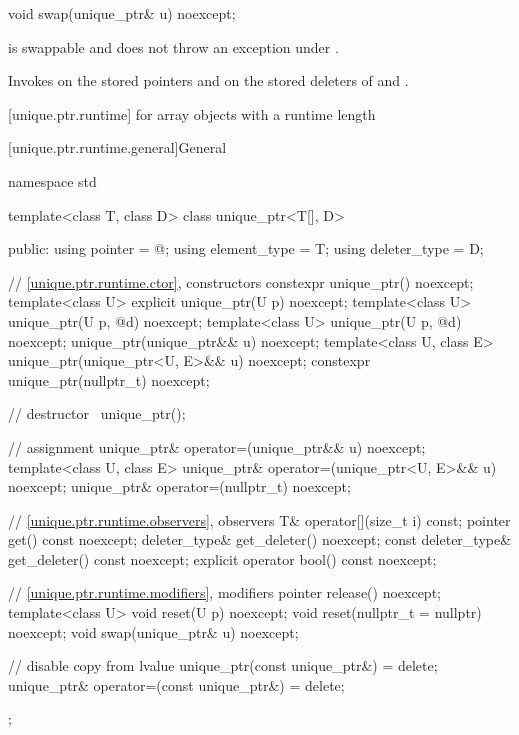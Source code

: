 %
\begin{itemdecl}
void swap(unique_ptr& u) noexcept;
\end{itemdecl}

\begin{itemdescr}
\pnum
\expects
{} is swappable and
does not throw an exception under .

\pnum
\effects
Invokes  on the stored pointers and on the stored
deleters of  and .
\end{itemdescr}

[unique.ptr.runtime]{ for array objects with a runtime length}

[unique.ptr.runtime.general]{General}

%
\begin{codeblock}
namespace std {
  template<class T, class D> class unique_ptr<T[], D> {
  public:
    using pointer      = @\seebelow@;
    using element_type = T;
    using deleter_type = D;

    // \ref{unique.ptr.runtime.ctor}, constructors
    constexpr unique_ptr() noexcept;
    template<class U> explicit unique_ptr(U p) noexcept;
    template<class U> unique_ptr(U p, @\seebelow@ d) noexcept;
    template<class U> unique_ptr(U p, @\seebelow@ d) noexcept;
    unique_ptr(unique_ptr&& u) noexcept;
    template<class U, class E>
      unique_ptr(unique_ptr<U, E>&& u) noexcept;
    constexpr unique_ptr(nullptr_t) noexcept;

    // destructor
    ~unique_ptr();

    // assignment
    unique_ptr& operator=(unique_ptr&& u) noexcept;
    template<class U, class E>
      unique_ptr& operator=(unique_ptr<U, E>&& u) noexcept;
    unique_ptr& operator=(nullptr_t) noexcept;

    // \ref{unique.ptr.runtime.observers}, observers
    T& operator[](size_t i) const;
    pointer get() const noexcept;
    deleter_type& get_deleter() noexcept;
    const deleter_type& get_deleter() const noexcept;
    explicit operator bool() const noexcept;

    // \ref{unique.ptr.runtime.modifiers}, modifiers
    pointer release() noexcept;
    template<class U> void reset(U p) noexcept;
    void reset(nullptr_t = nullptr) noexcept;
    void swap(unique_ptr& u) noexcept;

    // disable copy from lvalue
    unique_ptr(const unique_ptr&) = delete;
    unique_ptr& operator=(const unique_ptr&) = delete;
  };
}
\end{codeblock}

